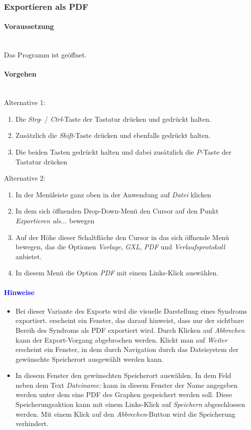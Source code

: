 \documentclass[enabledeprecatedfontcommands,fontsize=11pt,paper=a4,twoside]{scrartcl}
\newcounter{one}
\newcommand*{\hint}{\paragraph{\textcolor{blue}{Hinweise}}}
\newcommand*{\condition}{\paragraph{Voraussetzung}$\;$ \vspace{0.2cm}\\}
\newcommand*{\actions}{\paragraph{Vorgehen} $\;$\vspace{0.2cm}\\}
\begin{document}
		\subsubsection{Exportieren als PDF}
				\condition 	
		Das Programm ist geöffnet.
		\actions
		Alternative 1:
		\begin{enumerate}
				\item Die \textit{Strg}- / \textit{Ctrl}-Taste der Tastatur drücken und gedrückt halten.
				\item Zusätzlich die \textit{Shift}-Taste drücken und ebenfalls gedrückt halten.
				\item Die beiden Tasten gedrückt halten und dabei zusätzlich die \textit{P}-Taste der Tastatur drücken
		\end{enumerate}				
		Alternative 2:
		\begin{enumerate}
				\item In der Menüleiste ganz oben in der Anwendung auf \textit{Datei} klicken 
				\item In dem sich öffnenden Drop-Down-Menü den Cursor auf den Punkt \textit{Exportieren als...} bewegen
				\item Auf der Höhe dieser Schaltfläche den Cursor in das sich öffnende Menü bewegen, das die Optionen \textit{Vorlage}, \textit{GXL}, \textit{PDF} und \textit{Verlaufsprotokoll} anbietet.
				\item In diesem Menü die Option \textit{PDF} mit einem Links-Klick auswählen.
		\end{enumerate}		
		\hint
		\begin{itemize}
				\item Bei dieser Variante des Exports wird die visuelle Darstellung eines Syndroms exportiert.
				\Es erscheint ein Fenster, das darauf hinweist, dass nur der sichtbare Bereih des Syndroms als PDF exportiert wird. Durch Klicken auf \textit{Abbrechen} kann der Export-Vorgang abgebrochen werden. Klickt man auf \textit{Weiter} erscheint ein Fenster, in dem durch Navigation durch das Dateisystem der gewünschte Speicherort ausgewählt werden kann. 
				\item In diesem Fenster den gewünschten Speicherort auswählen. In dem Feld neben dem Text \textit{Dateiname:} kann in diesem Fenster der Name angegeben werden unter dem eine PDF des Graphen gespeichert werden soll. Diese Speicherungsaktion kann mit einem Links-Klick auf \textit{Speichern} abgeschlossen werden. Mit einem Klick auf den \textit{Abbrechen}-Button wird die Speicherung verhindert.
		\end{itemize}
		
\end{document}

